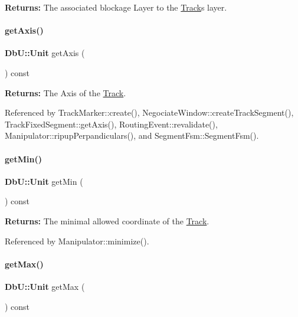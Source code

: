{\bfseries Returns\+:} The associated blockage {\ttfamily Layer} to the \hyperlink{classKite_1_1Track}{Track}\textquotesingle{}s layer. \mbox{\label{classKite_1_1Track_ab5b5aaa5b318369feee6003dbad039c2}} 
\paragraph{\texorpdfstring{get\+Axis()}{getAxis()}}
{\footnotesize\ttfamily \textbf{ Db\+U\+::\+Unit} get\+Axis (\begin{DoxyParamCaption}{ }\end{DoxyParamCaption}) const\hspace{0.3cm}{\ttfamily [inline]}}

{\bfseries Returns\+:} The Axis of the \hyperlink{classKite_1_1Track}{Track}. 

Referenced by Track\+Marker\+::create(), Negociate\+Window\+::create\+Track\+Segment(), Track\+Fixed\+Segment\+::get\+Axis(), Routing\+Event\+::revalidate(), Manipulator\+::ripup\+Perpandiculars(), and Segment\+Fsm\+::\+Segment\+Fsm().

\mbox{\label{classKite_1_1Track_a71f401dbc8d152b50522ee459ef63441}} 
\paragraph{\texorpdfstring{get\+Min()}{getMin()}}
{\footnotesize\ttfamily \textbf{ Db\+U\+::\+Unit} get\+Min (\begin{DoxyParamCaption}{ }\end{DoxyParamCaption}) const\hspace{0.3cm}{\ttfamily [inline]}}

{\bfseries Returns\+:} The minimal allowed coordinate of the \hyperlink{classKite_1_1Track}{Track}. 

Referenced by Manipulator\+::minimize().

\mbox{\label{classKite_1_1Track_a7fdc462696aede86c051edfaa6268e9a}} 
\paragraph{\texorpdfstring{get\+Max()}{getMax()}}
{\footnotesize\ttfamily \textbf{ Db\+U\+::\+Unit} get\+Max (\begin{DoxyParamCaption}{ }\end{DoxyParamCaption}) const\hspace{0.3cm}{\ttfamily [inline]}}

